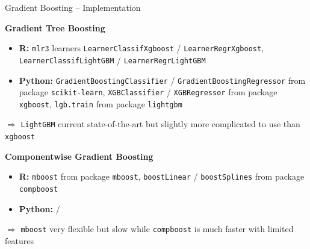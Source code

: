 \documentclass[11pt,compress,t,notes=noshow, xcolor=table]{beamer}
\newcommand{\highlight}[1]{\textcolor{hlcol}{\textbf{#1}}}
\begin{document}
\begin{frame2}{Gradient Boosting -- Implementation}

\highlight{Gradient Tree Boosting}
\begin{itemize}
  \item \textbf{R:} \texttt{mlr3} learners \texttt{LearnerClassifXgboost} / 
  \texttt{LearnerRegrXgboost}, \texttt{LearnerClassifLightGBM} / 
  \texttt{LearnerRegrLightGBM}
  \item \textbf{Python:} \texttt{GradientBoostingClassifier} / 
  \texttt{GradientBoostingRegressor} from package \texttt{scikit-learn}, 
  \texttt{XGBClassifier} / \texttt{XGBRegressor} from package \texttt{xgboost},
  \texttt{lgb.train} from package \texttt{lightgbm}
\end{itemize}

$\Rightarrow$ \texttt{LightGBM} current state-of-the-art but slightly more complicated to use than \texttt{xgboost} 

\medskip

\highlight{Componentwise Gradient Boosting}
\begin{itemize}
    \item \textbf{R:} \texttt{mboost} from package \texttt{mboost}, 
    \texttt{boostLinear} / \texttt{boostSplines} from package \texttt{compboost}
   \item \textbf{Python:} /
\end{itemize}

$\Rightarrow$ \texttt{mboost} very flexible but slow while \texttt{compboost} is much faster with limited features

\end{frame2}
\end{document}
